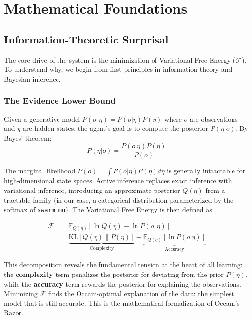 \chapter{Mathematical Foundations}

\section{Information-Theoretic Surprisal}

The core drive of the system is the minimization of Variational Free Energy ($\mathcal{F}$). To understand why, we begin from first principles in information theory and Bayesian inference.

\subsection{The Evidence Lower Bound}

Given a generative model $P(o, \eta) = P(o | \eta) P(\eta)$ where $o$ are observations and $\eta$ are hidden states, the agent's goal is to compute the posterior $P(\eta | o)$. By Bayes' theorem:
\begin{equation}
P(\eta | o) = \frac{P(o | \eta) P(\eta)}{P(o)}
\end{equation}

The marginal likelihood $P(o) = \int P(o | \eta) P(\eta) d\eta$ is generally intractable for high-dimensional state spaces. Active inference replaces exact inference with variational inference, introducing an approximate posterior $Q(\eta)$ from a tractable family (in our case, a categorical distribution parameterized by the softmax of \texttt{swarm\_mu}). The Variational Free Energy is then defined as:

\begin{align}
\mathcal{F} &= \mathbb{E}_{Q(\eta)}\left[\ln Q(\eta) - \ln P(o, \eta)\right] \\
&= \underbrace{\text{KL}\left[Q(\eta) \| P(\eta)\right]}_{\text{Complexity}} - \underbrace{\mathbb{E}_{Q(\eta)}\left[\ln P(o | \eta)\right]}_{\text{Accuracy}}
\end{align}

This decomposition reveals the fundamental tension at the heart of all learning: the \textbf{complexity} term penalizes the posterior for deviating from the prior $P(\eta)$, while the \textbf{accuracy} term rewards the posterior for explaining the observations. Minimizing $\mathcal{F}$ finds the Occam-optimal explanation of the data: the simplest model that is still accurate. This is the mathematical formalization of Occam's Razor.

